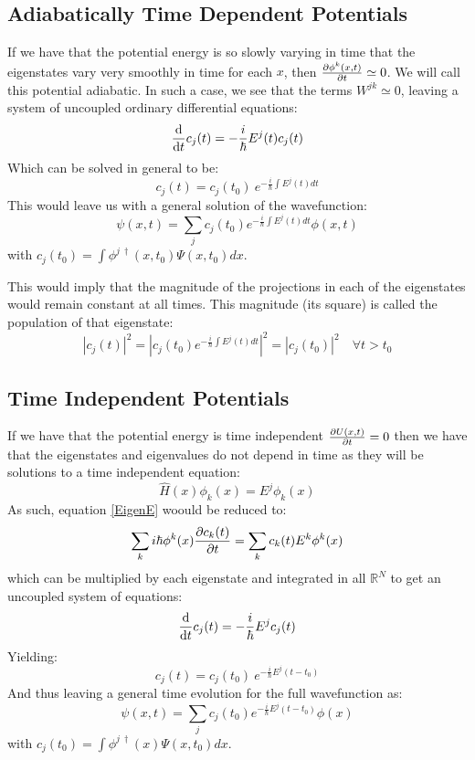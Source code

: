 \documentclass[11pt, a4paper]{article} %
\newcommand{\R}{\mathbb{R}} %
\begin{document}
\subsection{Adiabatically Time Dependent Potentials}

If we have that the potential energy is so slowly varying in time that the eigenstates vary very smoothly in time for each $x$, then $\pdv{\phi^k(x,t)}{t}\simeq 0$. We will call this potential adiabatic. In such a case, we see that the terms $W^{jk}\simeq 0$, leaving a system of uncoupled ordinary differential equations:
\begin{equation}
\dv{}{t}c_j(t)=-\frac{i}{\hbar}E^j(t) c_j(t)
\end{equation}
Which can be solved in general to be:
\begin{equation}
c_j(t)=c_j(t_0)\ e^{-\frac{i}{\hbar}\int E^j(t) dt}
\end{equation}
This would leave us with a general solution of the wavefunction:
\begin{equation}
\psi(x,t)=\sum_j c_j(t_0) e^{-\frac{i}{\hbar}\int E^j(t) dt} \phi(x,t)
\end{equation}
with $c_j(t_0)=\int \phi^{j\ \dagger}(x, t_0) \Psi(x,t_0)dx$.

This would imply that the magnitude of the projections in each of the eigenstates would remain constant at all times. This magnitude (its square) is called the population of that eigenstate:
$$
|c_j(t)|^2=|c_j(t_0)e^{-\frac{i}{\hbar}\int E^j(t) dt}|^2 = |c_j(t_0)|^2 \quad \forall t>t_0
$$

\subsection{Time Independent Potentials}

If we have that the potential energy is time independent $\pdv{U(x,t)}{t}=0$ then we have that the eigenstates and eigenvalues do not depend in time as they will be solutions to a time independent equation:
\begin{equation}
\hat{H}(x)\phi_k(x)=E^j\phi_k(x)
\end{equation}
As such, equation \eqref{EigenE} woould be reduced to:
\begin{equation}
\sum_k i\hbar \phi^k(x)\pdv{c_k(t)}{t}= \sum_k c_k(t)E^k\phi^k(x)
\end{equation}
which can be multiplied by each eigenstate and integrated in all $\R^N$ to get an uncoupled system of equations:
\begin{equation}
\dv{}{t}c_j(t)=-\frac{i}{\hbar}E^j c_j(t)
\end{equation}
Yielding:
\begin{equation}
c_j(t)=c_j(t_0)\ e^{-\frac{i}{\hbar}E^j(t-t_0)}
\end{equation}
And thus leaving a general time evolution for the full wavefunction as:
\begin{equation}
\psi(x,t)=\sum_j c_j(t_0) e^{-\frac{i}{\hbar}E^j(t-t_0)} \phi(x)
\end{equation}
with $c_j(t_0)=\int \phi^{j\ \dagger}(x) \Psi(x,t_0)dx$.
\end{document}
